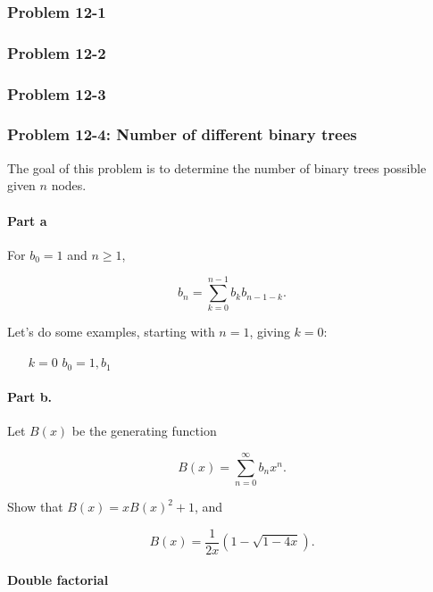 \documentclass{article}
\begin{document}
\subsubsection{Problem 12-1}

\subsubsection{Problem 12-2}

\subsubsection{Problem 12-3}

\subsubsection{Problem 12-4: Number of different binary trees}

The goal of this problem is to determine the number of binary
trees possible given $n$ nodes.

\paragraph{Part a} For $b_0 = 1$ and $n \geq 1$,

\[
b_n = \sum_{k=0}^{n-1} b_kb_{n-1-k}.
\]

Let's do some examples, starting with $n = 1$, giving $k = 0$:

\begin{itemize}
\item [$k=0$] $b_0 = 1, b_1$
\end{itemize}

\paragraph{Part b.} Let $B(x)$ be the generating function

\begin{equation}
B(x) = \sum_{n=0}^{\infty}b_nx^n.
\end{equation}

Show that $B(x) = xB(x)^2 + 1$, and

\begin{equation}
B(x) = \frac{1}{2x}(1-\sqrt{1-4x}).
\end{equation}


\paragraph{Double factorial}
\end{document}
